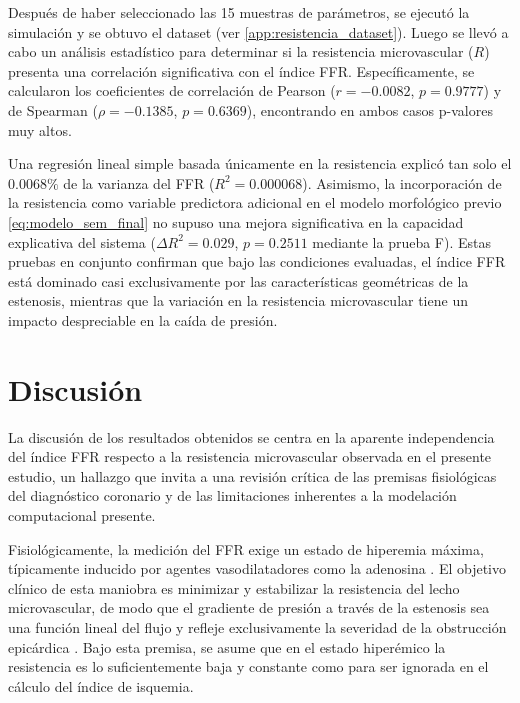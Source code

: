 \documentclass[12pt, letterpaper]{article}
\begin{document}
Después de haber seleccionado las 15 muestras de parámetros, se ejecutó la simulación y se obtuvo el dataset (ver \cref{app:resistencia_dataset}). Luego se llevó a cabo un análisis estadístico para determinar si la resistencia microvascular ($R$) presenta una correlación significativa con el índice FFR. Específicamente, se calcularon los coeficientes de correlación de Pearson ($r = -0.0082$, $p = 0.9777$) y de Spearman ($\rho = -0.1385$, $p = 0.6369$), encontrando en ambos casos p-valores muy altos. 

Una regresión lineal simple basada únicamente en la resistencia explicó tan solo el $0.0068\%$ de la varianza del FFR ($R^2 = 0.000068$). Asimismo, la incorporación de la resistencia como variable predictora adicional en el modelo morfológico previo \eqref{eq:modelo_sem_final} no supuso una mejora significativa en la capacidad explicativa del sistema ($\Delta R^2 = 0.029$, $p = 0.2511$ mediante la prueba F). Estas pruebas en conjunto confirman que bajo las condiciones evaluadas, el índice FFR está dominado casi exclusivamente por las características geométricas de la estenosis, mientras que la variación en la resistencia microvascular tiene un impacto despreciable en la caída de presión.

\section{Discusión}
La discusión de los resultados obtenidos se centra en la aparente independencia del índice FFR respecto a la resistencia microvascular observada en el presente estudio, un hallazgo que invita a una revisión crítica de las premisas fisiológicas del diagnóstico coronario y de las limitaciones inherentes a la modelación computacional presente.

Fisiológicamente, la medición del FFR exige un estado de hiperemia máxima, típicamente inducido por agentes vasodilatadores como la adenosina \cite{Jeremias2000Adequacy, Verdoia2019Impact}. El objetivo clínico de esta maniobra es minimizar y estabilizar la resistencia del lecho microvascular, de modo que el gradiente de presión a través de la estenosis sea una función lineal del flujo y refleje exclusivamente la severidad de la obstrucción epicárdica \cite{Johnson2015Repeatability}. Bajo esta premisa, se asume que en el estado hiperémico la resistencia es lo suficientemente baja y constante como para ser ignorada en el cálculo del índice de isquemia.
\end{document}
